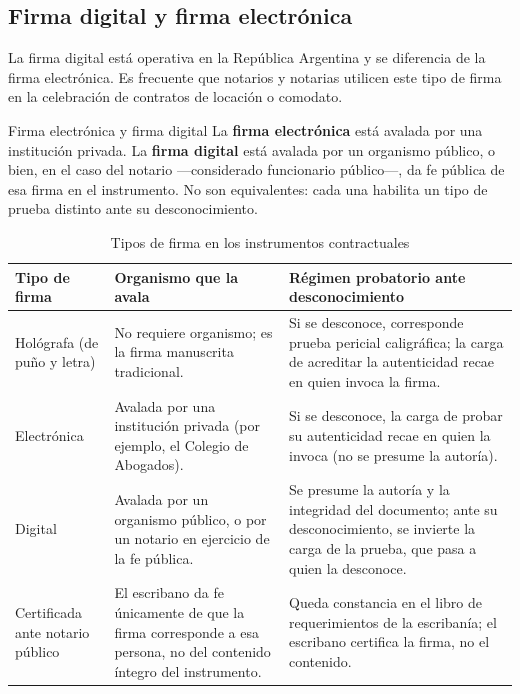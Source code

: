\documentclass[12pt,oneside]{book}
\begin{document}
\subsection{Firma digital y firma electrónica}

La firma digital está operativa en la República Argentina y se diferencia de la firma electrónica. Es frecuente que notarios y notarias utilicen este tipo de firma en la celebración de contratos de locación o comodato.

\begin{definition}{Firma electrónica y firma digital}
La \textbf{firma electrónica} está avalada por una institución privada. La \textbf{firma digital} está avalada por un organismo público, o bien, en el caso del notario ---considerado funcionario público---, da fe pública de esa firma en el instrumento. No son equivalentes: cada una habilita un tipo de prueba distinto ante su desconocimiento.
\end{definition}

\begin{table}[H]
\centering
\caption{Tipos de firma en los instrumentos contractuales}
\begin{tabularx}{\textwidth}{>{\raggedright\arraybackslash}p{} X X}
\toprule
\textbf{Tipo de firma} & \textbf{Organismo que la avala} & \textbf{Régimen probatorio ante desconocimiento} \\
\midrule
Hológrafa (de puño y letra) & No requiere organismo; es la firma manuscrita tradicional. & Si se desconoce, corresponde prueba pericial caligráfica; la carga de acreditar la autenticidad recae en quien invoca la firma. \\
Electrónica & Avalada por una institución privada (por ejemplo, el Colegio de Abogados). & Si se desconoce, la carga de probar su autenticidad recae en quien la invoca (no se presume la autoría). \\
Digital & Avalada por un organismo público, o por un notario en ejercicio de la fe pública. & Se presume la autoría y la integridad del documento; ante su desconocimiento, se invierte la carga de la prueba, que pasa a quien la desconoce. \\
Certificada ante notario público & El escribano da fe únicamente de que la firma corresponde a esa persona, no del contenido íntegro del instrumento. & Queda constancia en el libro de requerimientos de la escribanía; el escribano certifica la firma, no el contenido. \\
\bottomrule
\end{tabularx}
\end{table}
\end{document}
